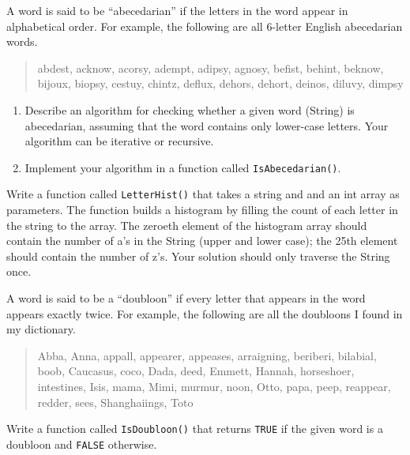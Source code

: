 
\begin{exercise}
A word is said to be ``abecedarian'' if the letters in the
word appear in alphabetical order.  For example, the following
are all 6-letter English abecedarian words.

\begin {quote}
abdest, acknow, acorsy, adempt, adipsy, agnosy, befist, behint,
beknow, bijoux, biopsy, cestuy, chintz, deflux, dehors, dehort,
deinos, diluvy, dimpsy
\end{quote}

\begin{enumerate}

\item Describe an algorithm for checking whether a given word (String)
is abecedarian, assuming that the word contains only lower-case
letters.  Your algorithm can be iterative or recursive.

\item Implement your algorithm in a function called {\tt IsAbecedarian()}.

\end{enumerate}
\end{exercise}



\begin{exercise}
Write a function called {\tt LetterHist()} that takes a string and and an int array as
parameters. The function builds a histogram by filling the count of each letter in the string to the array.
The zeroeth element of the histogram array should contain the number of a's
in the String (upper and lower case); the 25th element should contain
the number of z's.
Your solution should only traverse the String once.
\end{exercise}




\begin{exercise}
A word is said to be a ``doubloon'' if every letter that appears in the
word appears exactly twice.  For example, the following are all the
doubloons I found in my dictionary.

\begin {quote}
Abba, Anna, appall, appearer, appeases, arraigning, beriberi,
bilabial, boob, Caucasus, coco, Dada, deed, Emmett, Hannah,
horseshoer, intestines, Isis, mama, Mimi, murmur, noon, Otto, papa,
peep, reappear, redder, sees, Shanghaiings, Toto
\end{quote}

Write a function called {\tt IsDoubloon()} that returns {\tt TRUE}
if the given word is a doubloon and {\tt FALSE} otherwise.
\end{exercise}




